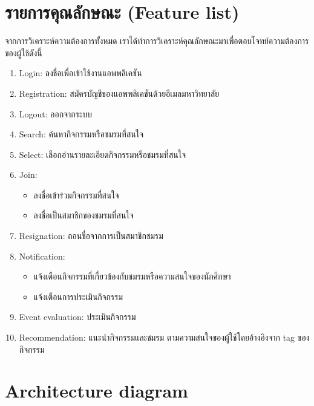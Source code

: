 \documentclass[14pt,oneside,openright,a4paper]{cpe-thai-project}
\begin{document}
\section{รายการคุณลักษณะ (Feature list)}
  จากการวิเคราะห์ความต้องการทั้งหมด เราได้ทำการวิเคราะห์คุณลักษณะมาเพื่อตอบโจทย์ความต้องการของผู้ใช้ดังนี้
\begin{enumerate}
  \item Login: ลงชื่อเพื่อเข้าใช้งานแอพพลิเคชัน
  \item Registration: สมัครบัญชีของแอพพลิเคชันด้วยอีเมลมหาวิทยาลัย
  \item Logout: ออกจากระบบ
  \item Search: ค้นหากิจกรรมหรือชมรมที่สนใจ
  \item Select: เลือกอ่านรายละเอียดกิจกรรมหรือชมรมที่สนใจ
  \item Join: 
  \begin{itemize}
    \item ลงชื่อเข้าร่วมกิจกรรมที่สนใจ
    \item ลงชื่อเป็นสมาชิกของชมรมที่สนใจ
  \end{itemize}
  \item Resignation: ถอนชื่อจากการเป็นสมาชิกชมรม
  \item Notification: 
  \begin{itemize}
    \item แจ้งเตือนกิจกรรมที่เกี่ยวข้องกับชมรมหรือความสนใจของนักศึกษา
    \item แจ้งเตือนการประเมินกิจกรรม
  \end{itemize}
  \item Event evaluation: ประเมินกิจกรรม
  \item Recommendation: แนะนำกิจกรรมและชมรม ตามความสนใจของผู้ใช้โดยอ้างอิงจาก tag ของกิจกรรม
\end{enumerate}

\newpage

\section{Architecture diagram}
\end{document}
